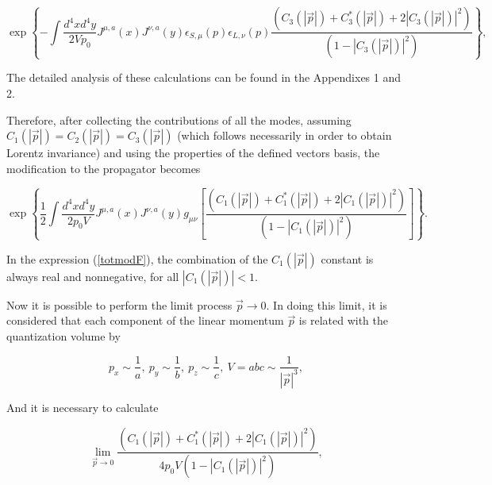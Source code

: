 \documentclass[12pt,letterpaper]{report}
\begin{document}
\begin{equation}
\exp \left\{ -\int \frac{d^4xd^4y}{2Vp_0}J^{\mu,a}\left(x\right)
J^{\nu,a}\left(y\right) \epsilon _{S,\mu }\left(p\right) \epsilon
_{L,\nu }\left(p\right) \frac{\left(C_3\left(\left| \vec{p}\right|
\right) +C_3^{*}\left(\left| \vec{p}\right| \right) +2\left|
C_3\left(\left| \vec{p} \right| \right) \right| ^2\right) }{\left(
1-\left| C_3\left(\left| \vec{p} \right| \right) \right| ^2\right)
}\right\}, \label{L1}
\end{equation}

The detailed analysis of these calculations can be found in the
Appendixes 1 and 2.

Therefore, after collecting the contributions of all the modes,
assuming $ C_1\left(\left| \vec{p}\right| \right) =C_2\left(
\left| \vec{p}\right| \right) =C_3\left(\left| \vec{p}\right|
\right) $ (which follows necessarily in order to obtain Lorentz
invariance) and using the properties of the defined vectors basis,
the modification to the propagator becomes

\begin{equation}
\exp \left\{ \frac 12\int \frac{d^4xd^4y}{2p_0V}J^{\mu,a}\left(
x\right) J^{\nu,a}\left(y\right) g_{\mu \nu }\left[ \frac{\left(
C_1\left(\left| \vec{p}\right| \right) +C_1^{*}\left(\left|
\vec{p}\right| \right) +2\left| C_1\left(\left| \vec{p}\right|
\right) \right| ^2\right) }{\left(1-\left| C_1\left(\left|
\vec{p}\right| \right) \right| ^2\right) }\right] \right\}.
\label{totmodF}
\end{equation}

In the expression (\ref{totmodF}), the combination of the
$C_1\left(\left| \vec{p}\right| \right) $ constant is always real
and nonnegative, for all $ \left| C_1\left(\left| \vec{p}\right|
\right) \right| <1$.

Now it is possible to perform the limit process
$\vec{p}\rightarrow 0$. In doing this limit, it is considered that
each component of the linear momentum $\vec{p}$ is related with
the quantization volume by

\[
p_x\sim \frac 1a,\ p_y\sim \frac 1b,\ p_z\sim \frac 1c,\ V=abc\sim
\frac 1{\left| \vec{p}\right| ^3},
\]
$\ \ $

And it is necessary to calculate

\begin{equation}
\lim_{\vec{p}\rightarrow 0}\frac{\left(C_1\left(\left|
\vec{p}\right| \right) +C_1^{*}\left(\left| \vec{p}\right| \right)
+2\left| C_1\left(\left| \vec{p}\right| \right) \right| ^2\right)
}{4p_0V\left(1-\left| C_1\left(\left| \vec{p}\right| \right)
\right| ^2\right) },\label{Lim1}
\end{equation}
\end{document}
